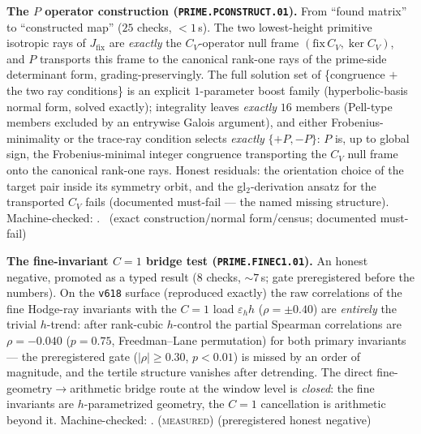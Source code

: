 \documentclass[11pt,a4paper]{article}
\theoremstyle{definition}
\begin{document}
\par\smallskip\noindent\textbf{The $P$ operator construction
(\texttt{PRIME.PCONSTRUCT.01}).}
From ``found matrix'' to ``constructed map'' ($25$ checks, $<1$\,s).
The two lowest-height primitive isotropic rays of $J_{\mathrm{fix}}$
are \emph{exactly} the $C_V$-operator null frame $(\mathrm{fix}\,C_V,
\ker C_V)$, and $P$ transports this frame to the canonical rank-one
rays of the prime-side determinant form, grading-preservingly.  The
full solution set of \{congruence $+$ the two ray conditions\} is an
explicit $1$-parameter boost family (hyperbolic-basis normal form,
solved exactly); integrality leaves \emph{exactly} $16$ members
(Pell-type members excluded by an entrywise Galois argument), and
either Frobenius-minimality or the trace-ray condition selects
\emph{exactly} $\{+P,-P\}$: $P$ is, up to global sign, the
Frobenius-minimal integer congruence transporting the $C_V$ null frame
onto the canonical rank-one rays.  Honest residuals: the orientation
choice of the target pair inside its symmetry orbit, and the
gl$_2$-derivation ansatz for the transported $C_V$ fails (documented
must-fail --- the named missing structure).
Machine-checked: .
\mE\ (exact construction/normal form/census; documented must-fail)
\par\smallskip

\par\smallskip\noindent\textbf{The fine-invariant $C=1$ bridge test
(\texttt{PRIME.FINEC1.01}).}
An honest negative, promoted as a typed result ($8$ checks,
${\sim}7$\,s; gate preregistered before the numbers).  On the
\texttt{v618} surface (reproduced exactly) the raw correlations of the
fine Hodge-ray invariants with the $C=1$ load $\varepsilon_h h$
($\rho=\pm0.40$) are \emph{entirely} the trivial $h$-trend: after
rank-cubic $h$-control the partial Spearman correlations are
$\rho=-0.040$ ($p=0.75$, Freedman--Lane permutation) for both primary
invariants --- the preregistered gate ($|\rho|\ge0.30$, $p<0.01$) is
missed by an order of magnitude, and the tertile structure vanishes
after detrending.  The direct fine-geometry$\to$arithmetic bridge
route at the window level is \emph{closed}: the fine invariants are
$h$-parametrized geometry, the $C=1$ cancellation is arithmetic beyond
it.
Machine-checked: .
(\textsc{measured}) (preregistered honest negative)
\par\smallskip
\end{document}
